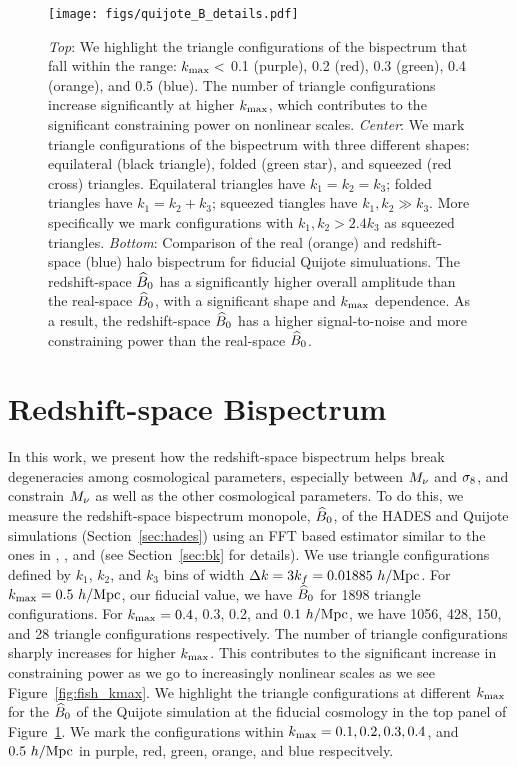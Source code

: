 \begin{figure}
\begin{center}
    \texttt{[image: figs/quijote\_B\_details.pdf]}
    \caption{
        {\em Top}: We highlight the triangle configurations of the bispectrum that fall within the range: 
        $k_{\rm max} <$ 0.1 (purple), 0.2 (red), 0.3 (green), 0.4 (orange), and 0.5 (blue). The number of 
        triangle configurations increase significantly at higher $k_{\rm max}$, which contributes to the 
        significant constraining power on nonlinear scales. 
        {\em Center}: We mark triangle configurations of the bispectrum with three different shapes:
        equilateral (black triangle), folded (green star), and squeezed (red cross) triangles. Equilateral 
        triangles have $k_1 = k_2 = k_3$; folded triangles have $k_1 = k_2 + k_3$; squeezed tiangles have 
        $k_1, k_2 \gg k_3$. More specifically we mark configurations with $k_1, k_2 > 2.4k_3$ as squeezed 
        triangles. 
        {\em Bottom}: Comparison of the real (orange) and redshift-space (blue) halo bispectrum for 
        fiducial Quijote simuluations. The redshift-space $\widehat{B}_0$ has a significantly higher 
        overall amplitude than the real-space $\widehat{B}_0$, with a significant shape and $k_{\rm max}$ 
        dependence. As a result, the redshift-space $\widehat{B}_0$ has a higher signal-to-noise and more 
        constraining power than the real-space $\widehat{B}_0$.  
    } 
\label{fig:bk_details}
\end{center}
\end{figure}
\section{Redshift-space Bispectrum} 
In this work, we present how the redshift-space bispectrum helps break degeneracies 
among cosmological parameters, especially between $M_\nu$ and $\sigma_8$, and constrain 
$M_\nu$ as well as the other cosmological parameters. To do this, we measure the 
redshift-space bispectrum monopole, $\widehat{B}_0$, of the HADES and Quijote simulations 
(Section~\ref{sec:hades}) using an FFT based estimator similar to the ones in 
\cite{sefusatti2005a}, \cite{scoccimarro2015}, and \cite{sefusatti2016} 
(see Section~\ref{sec:bk} for details). We use triangle configurations defined by 
$k_1$, $k_2$, and $k_3$ bins of width $\Delta k = 3k_f = 0.01885~h/{\rm Mpc}$. 
For $k_{\rm max} = 0.5~h/{\rm Mpc}$, our fiducial value, we have $\widehat{B}_0$ for 1898 
triangle configurations. For $k_{\rm max} = 0.4$, 0.3, 0.2, and $0.1~h/{\rm Mpc}$, 
we have 1056, 428, 150, and 28 triangle configurations respectively. The number
of triangle configurations sharply increases for higher $k_{\rm max}$. This
contributes to the significant increase in constraining power as we go to increasingly 
nonlinear scales as we see Figure~\ref{fig:fish_kmax}. We highlight the triangle 
configurations at different $k_{\rm max}$ for the $\widehat{B}_0$ of the Quijote simulation 
at the fiducial cosmology in the top panel of Figure~\ref{fig:bk_details}. We mark 
the configurations within $k_{\rm max} = 0.1, 0.2, 0.3, 0.4$, and $0.5~h/{\rm Mpc}$ 
in purple, red, green, orange, and blue respecitvely. 

